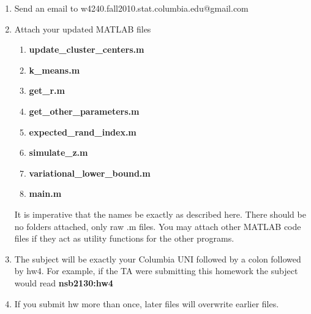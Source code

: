 \documentclass[12pt]{article}
\begin{document}
\begin{enumerate}
	\item Send an email to w4240.fall2010.stat.columbia.edu@gmail.com
	\item {Attach your updated MATLAB files 
		\begin{enumerate}
			\item {\bf update\_cluster\_centers.m} 
			\item	 {\bf k\_means.m}
			\item  {\bf get\_r.m}
			\item {\bf get\_other\_parameters.m}
			\item  {\bf expected\_rand\_index.m}
			\item {\bf simulate\_z.m}
			\item {\bf variational\_lower\_bound.m}
			\item  {\bf main.m}
		\end{enumerate} It is imperative that the names be exactly as described here. There should be no folders attached, only raw .m files.  You may attach other MATLAB code files if they act as utility functions for the other programs. }
	\item The subject will be exactly your Columbia UNI followed by a colon followed by hw4.  For example, if the TA were submitting this homework the subject would read {\bf nsb2130:hw4}
	\item If you submit hw more than once, later files will overwrite earlier files.
\end{enumerate}


\problemsdone
\end{document}
